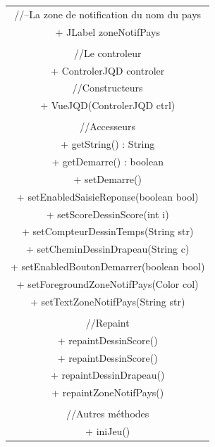 \documentclass{article}
\begin{document}
\begin{center}
\begin{longtable}{|c|}
	  //--La zone de notification du nom du pays\\
	  + JLabel zoneNotifPays\\
	  \\
	  //Le controleur\\
	  + ControlerJQD controler\\
	\hline
	//Constructeurs\\
	+ VueJQD(ControlerJQD ctrl)\\
	\\
	//Accesseurs\\
	+ getString() : String\\
	+ getDemarre() : boolean\\
	+ setDemarre()\\
	+ setEnabledSaisieReponse(boolean bool)\\
	+ setScoreDessinScore(int i)\\
	+ setCompteurDessinTemps(String str)\\
	+ setCheminDessinDrapeau(String c)\\
	+ setEnabledBoutonDemarrer(boolean bool)\\
	+ setForegroundZoneNotifPays(Color col)\\
	+ setTextZoneNotifPays(String str)\\
	\\
	//Repaint\\
	+ repaintDessinScore()\\
	+ repaintDessinScore()\\
	+ repaintDessinDrapeau()\\
	+ repaintZoneNotifPays()\\
	\\
	//Autres méthodes\\
	+ iniJeu()\\
	\hline
\end{longtable}
\end{center}
\end{document}
